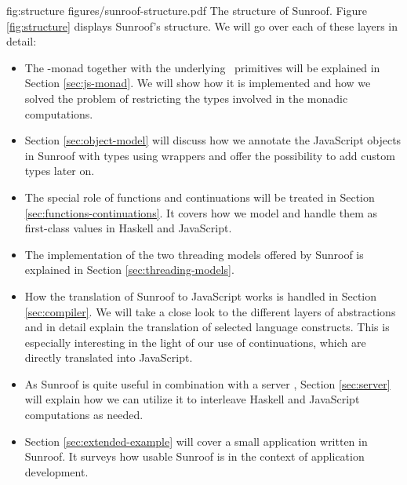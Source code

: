 \Figure%
{fig:structure}%
{figures/sunroof-structure.pdf}%
{The structure of Sunroof.}
Figure \ref{fig:structure} displays Sunroof's structure. 
We will go over each of these layers in detail:
\begin{itemize}
\item
The \JS-monad together with the underlying \JSI~primitives 
will be explained in Section \ref{sec:js-monad}. 
We will show how it is implemented and how we solved
the problem of restricting the types involved in the monadic 
computations.
\item
Section \ref{sec:object-model} will discuss how we annotate 
the JavaScript objects in Sunroof with types using wrappers 
and offer the possibility 
to add custom types later on.
\item
The special role of functions and continuations will
be treated in Section \ref{sec:functions-continuations}. 
It covers how we model and handle
them as first-class values in Haskell and JavaScript.
\item
The implementation of the two threading models offered by Sunroof is explained 
in Section \ref{sec:threading-models}.
\item
How the translation of Sunroof to JavaScript works is handled in 
Section \ref{sec:compiler}. We will take a close look to the
different layers of abstractions and in detail explain the 
translation of selected language constructs. This is 
especially interesting in the light of our use of continuations, which
are directly translated into JavaScript.
\item
As Sunroof is quite useful in combination with a server \cite{Farmer:12:WebDSLs},
Section \ref{sec:server} will explain how we can utilize it 
to interleave Haskell and JavaScript computations as needed.
\item
Section \ref{sec:extended-example} will cover a small application 
written in Sunroof. 
It surveys how usable Sunroof is in the context of application development. 
\end{itemize}

